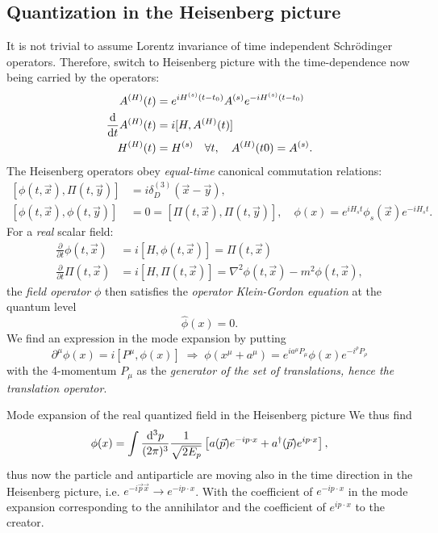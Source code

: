 \subsection{Quantization in the Heisenberg picture}
It is not trivial to assume Lorentz invariance of time independent Schrödinger operators. Therefore, switch to Heisenberg picture with the time-dependence now being carried by the operators:
\begin{align}
	A^{(H)} (t) &= e^{i H^{(s)} (t-t_0)} A^{(s)} e^{-i H^{(s)} (t-t_0)}\\
	\frac{\mathrm{d}}{\mathrm{d} t} A^{(H)} (t) &= i [H,A^{(H)}(t)] \\
	H^{(H)} (t) &= H^{(s)} \quad \forall t, \quad A^{(H)}(t0)=A^{(s)}.
\end{align}
The Heisenberg operators obey \emph{equal-time} canonical commutation relations:
\begin{align}
	\label{eq:canonicalQFTequaltimecommutationrel}
	[\phi(t,\vec{x}),\Pi(t,\vec{y})]&= i \delta^{(3)}_D (\vec{x}-\vec{y}),\\
	[\phi(t,\vec{x}), \phi(t,\vec{y})] &= 0 = [\Pi(t,\vec{x}) ,\Pi(t,\vec{y})], \quad \phi(x)=e^{i H_s t} \phi_s(\vec{x}) e^{- iH_s t}.
\end{align}
For a \emph{real} scalar field:
\begin{align}
	\frac{\partial}{\partial t} \phi(t,\vec{x}) &= i[H,\phi(t,\vec{x})] = \Pi(t,\vec{x})\\
	\frac{\partial}{\partial t} \Pi(t,\vec{x}) &= i [H,\Pi(t,\vec{x})] = \nabla^2 \phi(t,\vec{x}) - m^2 \phi(t,\vec{x}),
\end{align}
the \emph{field operator} $ \phi$ then satisfies the \emph{operator Klein-Gordon equation} at the quantum level 
\begin{equation}
	[\partial_{\mu} \partial^{\mu}+m^2] \hat{\phi}(x) =0.
\end{equation}
We find an expression in the mode expansion by putting
\begin{equation}
	\partial^{\mu} \phi (x) = i[P^{\mu},\phi(x)] \; \Rightarrow \; \phi(x^{\mu} +a^{\mu}) = e^{i a^{\mu} P_{\mu}} \phi(x) e^{- i^{\rho}P_{\rho}}
\end{equation}
with the 4-momentum $P_{\mu}$ as the \emph{generator of the set of translations, hence the translation operator}.\\
\begin{mybox}{Mode expansion of the real quantized field in the Heisenberg picture}
	We thus find \begin{equation}
		\phi(x) = \int \frac{\mathrm{d}^3 p}{(2 \pi)^3} \frac{1}{\sqrt{2E_p}} \left[a(\vec{p}) e^{- i p\cdot x} +a^{\dagger} (\vec{p}) e^{i p \cdot x} \right],
	\end{equation}
	thus now the particle and antiparticle are moving also in the time direction in the Heisenberg picture, i.e. $e^{- i \vec{p}\vec{x}} \rightarrow e^{-i p\cdot x}$. With the coefficient of $e^{- i p\cdot x }$ in the mode expansion corresponding to the annihilator and the coefficient of $e^{i p\cdot x}$ to the creator.
\end{mybox}
